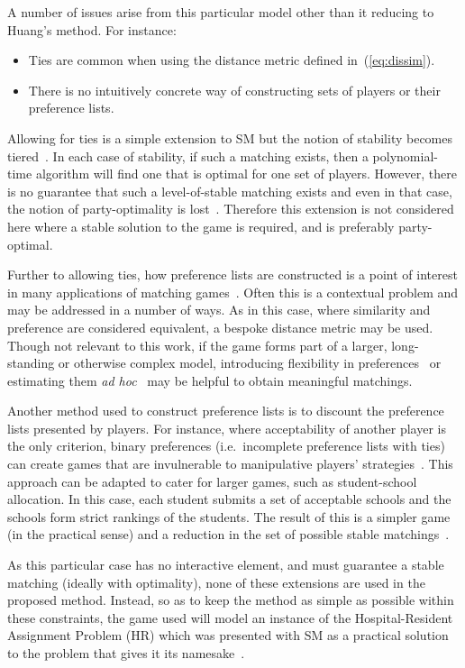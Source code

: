 A number of issues arise from this particular model other than it reducing to
Huang's method. For instance:
\begin{itemize}
    \item Ties are common when using the distance metric defined
        in~(\ref{eq:dissim}).
    \item There is no intuitively concrete way of constructing sets of players
        or their preference lists.
\end{itemize}

Allowing for ties is a simple extension to SM but the notion of stability
becomes tiered~\cite{Manlove1999}. In each case of stability, if such a matching
exists, then a polynomial-time algorithm will find one that is optimal for one
set of players. However, there is no guarantee that such a level-of-stable
matching exists and even in that case, the notion of party-optimality is
lost~\cite{Erdil2017}. Therefore this extension is not considered here where a
stable solution to the game is required, and is preferably party-optimal.

Further to allowing ties, how preference lists are constructed is a point of
interest in many applications of matching games~\cite{Iwama2008}. Often this is
a contextual problem and may be addressed in a number of ways. As in this case,
where similarity and preference are considered equivalent, a bespoke distance
metric may be used. Though not relevant to this work, if the game forms part of
a larger, long-standing or otherwise complex model, introducing flexibility in
preferences~\cite{Agarwal2017,Menzel2015} or estimating them
\emph{ad hoc}~\cite{Rastegari2016} may be helpful to obtain meaningful
matchings.

Another method used to construct preference lists is to discount the preference
lists presented by players. For instance, where acceptability of another player
is the only criterion, binary preferences (i.e.\ incomplete preference lists
with ties) can create games that are invulnerable to manipulative players'
strategies~\cite{Bogomolnaia2004}. This approach can be adapted to cater for
larger games, such as student-school allocation. In this case, each student
submits a set of acceptable schools and the schools form strict rankings of the
students. The result of this is a simpler game (in the practical sense) and a
reduction in the set of possible stable matchings~\cite{Haeringer2014}.

As this particular case has no interactive element, and must guarantee a stable
matching (ideally with optimality), none of these extensions are used in the
proposed method. Instead, so as to keep the method as simple as possible within
these constraints, the game used will model an instance of the Hospital-Resident
Assignment Problem (HR) which was presented with SM as a practical solution to
the problem that gives it its namesake~\cite{Gale1962}.

